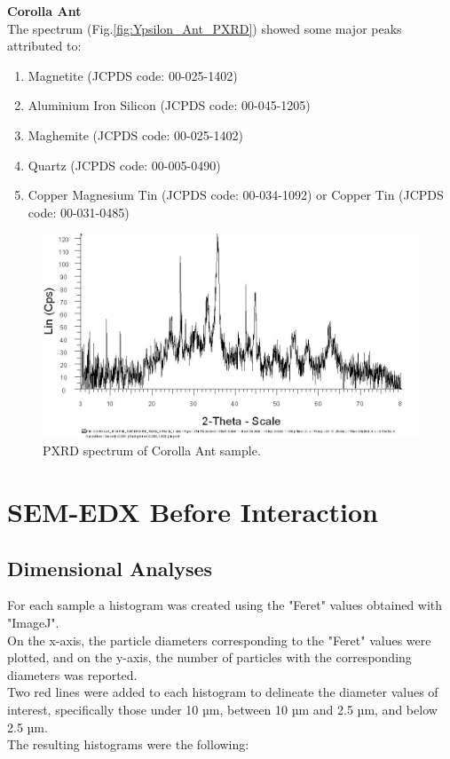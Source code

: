 \textbf{Corolla Ant} \\
The spectrum (Fig.\ref{fig:Ypsilon_Ant_PXRD}) showed some major peaks attributed to:

\begin{enumerate}[noitemsep]
    \item Magnetite (JCPDS code: 00-025-1402)
    \item Aluminium Iron Silicon (JCPDS code: 00-045-1205)
    \item Maghemite (JCPDS code: 00-025-1402)
    \item Quartz (JCPDS code: 00-005-0490)
    \item Copper Magnesium Tin (JCPDS code: 00-034-1092) or Copper Tin (JCPDS code: 00-031-0485)
\end{enumerate}

\begin{figure}[H]
\centering
    \includegraphics[scale=0.46]{images/Corolla_Hybrid_Ant.jpg}
    \caption{PXRD spectrum of Corolla Ant sample.}
    \label{fig:Corolla_Ant_PXRD}
\end{figure} 
\pagebreak

\section{SEM-EDX Before Interaction}

\subsection{Dimensional Analyses}

For each sample a histogram was created using the "Feret" values obtained with "ImageJ".\\
On the x-axis, the particle diameters corresponding to the "Feret" values were plotted, and on the y-axis, the number of particles with the corresponding diameters was reported. \\
Two red lines were added to each histogram to delineate the diameter values of interest, specifically those under 10 µm, between 10 µm and 2.5 µm, and below 2.5 µm.\\
The resulting histograms were the following:

